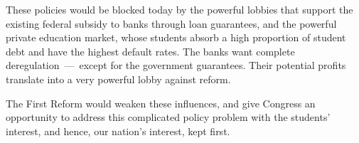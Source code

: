 These policies would be blocked today by the powerful lobbies that support the existing federal subsidy to banks through loan guarantees, and the powerful private education market, whose students absorb a high proportion of student debt and have the highest default rates. The banks want complete deregulation~---~except for the government guarantees. Their potential profits translate into a very powerful lobby against reform.

The First Reform would weaken these influences, and give Congress an opportunity to address this complicated policy problem with the students' interest, and hence, our nation's interest, kept first.
